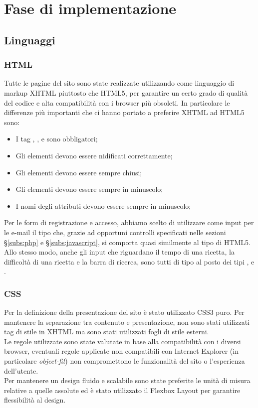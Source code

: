 \section{Fase di implementazione}
\label{sec:fase_di_implementazione}
\subsection{Linguaggi}
\subsubsection{HTML}
Tutte le pagine del sito sono state realizzate utilizzando come linguaggio di markup XHTML piuttosto che HTML5, per garantire un certo grado di qualità del codice e alta compatibilità con i browser più obsoleti. In particolare le differenze più importanti che ci hanno portato a preferire XHTML ad HTML5 sono:
\begin{itemize}
	\item I tag , ,  e  sono obbligatori;
	\item Gli elementi devono essere nidificati correttamente;
	\item Gli elementi devono essere sempre chiusi;
	\item Gli elementi devono essere sempre in minuscolo;
	\item I nomi degli attributi devono essere sempre in minuscolo;
\end{itemize}
Per le form di registrazione e accesso, abbiamo scelto di utilizzare come input per le e-mail il tipo  che, grazie ad opportuni controlli specificati nelle sezioni \S\ref{subs:php} e \S\ref{subs:javascript}, si comporta quasi similmente al tipo  di HTML5. Allo stesso modo, anche gli input che riguardano il tempo di una ricetta, la difficoltà di una ricetta e la barra di ricerca, sono tutti di tipo  al posto dei tipi ,  e .

\subsubsection{CSS}
Per la definizione della presentazione del sito è stato utilizzato CSS3 puro. Per mantenere la separazione tra contenuto e presentazione, non sono stati utilizzati tag di stile in XHTML ma sono stati utilizzati fogli di stile esterni. \\
Le regole utilizzate sono state valutate in base alla compatibilità con i diversi browser, eventuali regole applicate non compatibili con Internet Explorer (in particolare \textit{object-fit}) non compromettono le funzionalità del sito o l'esperienza dell'utente. \\
Per mantenere un design fluido e scalabile sono state preferite le unità di misura relative a quelle assolute ed è stato utilizzato il Flexbox Layout per garantire flessibilità al design.

